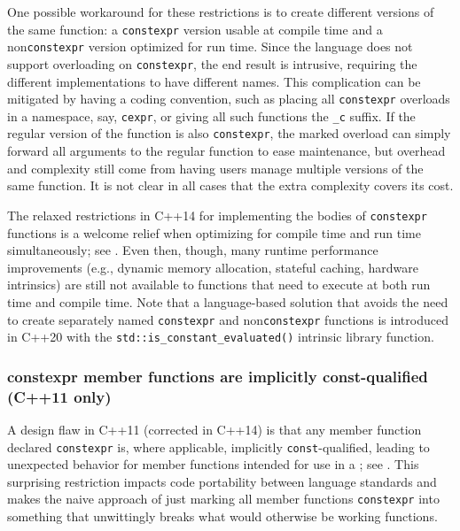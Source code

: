 One possible workaround for these restrictions is to create different
versions of the same function: a \lstinline!constexpr! version usable at
compile time and a non\lstinline!constexpr! version optimized for run time.
Since the language does not support overloading on \lstinline!constexpr!,
the end result is intrusive, requiring the different implementations to
have different names. This complication can be mitigated by having a
coding convention, such as placing all \lstinline!constexpr! overloads in a
namespace, say, \lstinline!cexpr!, or giving all such functions the
\lstinline!_c! suffix. If the regular version of the function is also
\lstinline!constexpr!, the marked overload can simply forward all arguments
to the regular function to ease maintenance, but overhead and complexity
still come from having users manage multiple versions of the same
function. It is not clear in all cases that the extra complexity covers
its cost.

The relaxed restrictions in C++14 for implementing the bodies of
\lstinline!constexpr! functions is a welcome relief when optimizing for
compile time and run time simultaneously; see
. Even then, though, many
runtime performance improvements (e.g., dynamic memory allocation,
stateful caching, hardware intrinsics) are still not available to
functions that need to execute at both run time and compile time. Note
that a language-based solution that avoids the need to create separately
named \lstinline!constexpr! and non\lstinline!constexpr! functions is
introduced in C++20 with the \lstinline!std::is_constant_evaluated()!
intrinsic library function.

\subsubsection[\lstinline!constexpr! member functions are implicitly \lstinline!const!-qualified (C++11 only)]{{\SubsubsecCode constexpr} member functions are implicitly {\SubsubsecCode const}-qualified (C++11 only)}\label{constexpr-member-functions-are-implicitly-const-qualified-(c++11-only)}

A design flaw in C++11 (corrected in C++14) is that any member function
declared \lstinline!constexpr! is, where applicable, implicitly
\lstinline!const!-qualified, leading to unexpected behavior for member
functions intended for use in a ;
see . This surprising
restriction impacts code portability between language standards and
makes the naive approach of just marking all member functions
\lstinline!constexpr! into something that unwittingly breaks what would
otherwise be working functions.

